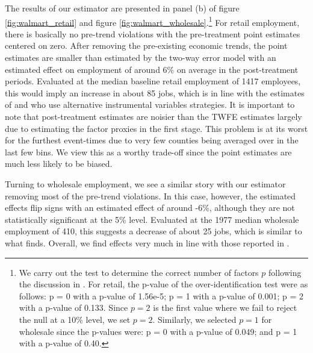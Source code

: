 \documentclass[12pt]{article}
\begin{document}
The results of our estimator are presented in panel (b) of figure \ref{fig:walmart_retail} and figure \ref{fig:walmart_wholesale}.\footnote{We carry out the test to determine the correct number of factors $p$ following the discussion in \citet{Ahn_Lee_Schmidt_2013}. For retail, the p-value of the over-identification test were as follows: p = 0 with a p-value of 1.56e-5; p = 1 with a p-value of 0.001; p = 2 with a p-value of 0.133.  Since $p = 2$ is the first value where we fail to reject the null at a 10\% level, we set $p = 2$. Similarly, we selected $p = 1$ for wholesale since the p-values were: p = 0 with a p-value of 0.049; and p = 1 with a p-value of 0.40.} For retail employment, there is basically no pre-trend violations with the pre-treatment point estimates centered on zero. After removing the pre-existing economic trends, the point estimates are smaller than estimated by the two-way error model with an estimated effect on employment of around 6\% on average in the post-treatment periods. Evaluated at the median baseline retail employment of 1417 employees, this would imply an increase in about 85 jobs, which is in line with the estimates of \citet{basker2005job} and \citet{stapp2014Walmart} who use alternative instrumental variables strategies. It is important to note that post-treatment estimates are noisier than the TWFE estimates largely due to estimating the factor proxies in the first stage. This problem is at its worst for the furthest event-times due to very few counties being averaged over in the last few bins. We view this as a worthy trade-off since the point estimates are much less likely to be biased. 

Turning to wholesale employment, we see a similar story with our estimator removing most of the pre-trend violations. In this case, however, the estimated effects flip signs with an estimated effect of around -6\%, although they are not statistically significant at the 5\% level. Evaluated at the 1977 median wholesale employment of 410, this suggests a decrease of about 25 jobs, which is similar to what \citet{basker2005job} finds. Overall, we find effects very much in line with those reported in \citet{basker2005job}.
\end{document}
